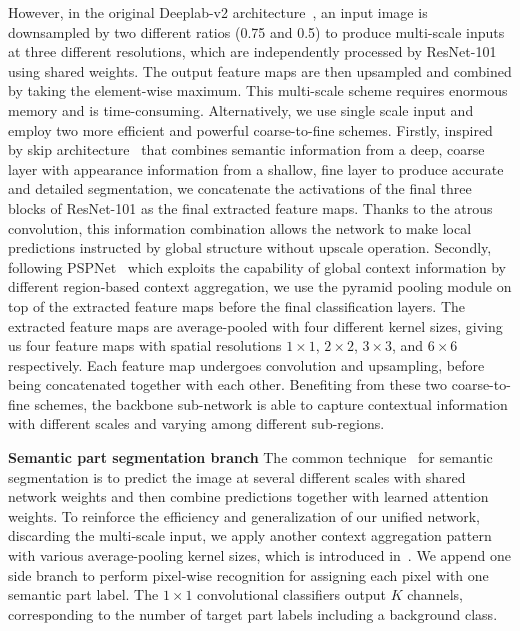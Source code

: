 \documentclass[runningheads]{llncs}
\begin{document}
However, in the original Deeplab-v2 architecture~\cite{chen2016deeplab}, an input image is downsampled by two different ratios (0.75 and 0.5) to produce multi-scale inputs at three different resolutions, which are independently processed by ResNet-101 using shared weights. The output feature maps are then upsampled and combined by taking the element-wise maximum. This multi-scale scheme requires enormous memory and is time-consuming. Alternatively, we use single scale input and employ two more efficient and powerful coarse-to-fine schemes. Firstly, inspired by skip architecture~\cite{long2014fully} that combines semantic information from a deep, coarse layer with appearance information from a shallow, fine layer to produce accurate and detailed segmentation, we concatenate the activations of the final three blocks of ResNet-101 as the final extracted feature maps. Thanks to the atrous convolution, this information combination allows the network to make local predictions instructed by global structure without upscale operation. Secondly, following PSPNet~\cite{Zhao_2017_CVPR} which exploits the capability of global context information by different region-based context aggregation, we use the pyramid pooling module on top of the extracted feature maps before the final classification layers. The extracted feature maps are average-pooled with four different kernel sizes, giving us four feature maps with spatial resolutions $1\times1$, $2\times2$, $3\times3$, and $6\times6$ respectively. Each feature map undergoes convolution and upsampling, before being concatenated together with each other. Benefiting from these two coarse-to-fine schemes, the backbone sub-network is able to capture contextual information with different scales and varying among different sub-regions.


\textbf{Semantic part segmentation branch} 
The common technique~\cite{chen2015attention,chen2016deeplab} for semantic segmentation is to predict the image at several different scales with shared network weights and then combine predictions together with learned attention weights. To reinforce the efficiency and generalization of our unified network, discarding the multi-scale input, we apply another context aggregation pattern with various average-pooling kernel sizes, which is introduced in~\cite{Zhao_2017_CVPR}. We append one side branch to perform pixel-wise recognition for assigning each pixel with one semantic part label. The $1\times1$ convolutional classifiers output $K$ channels, corresponding to the number of target part labels including a background class.
\end{document}
